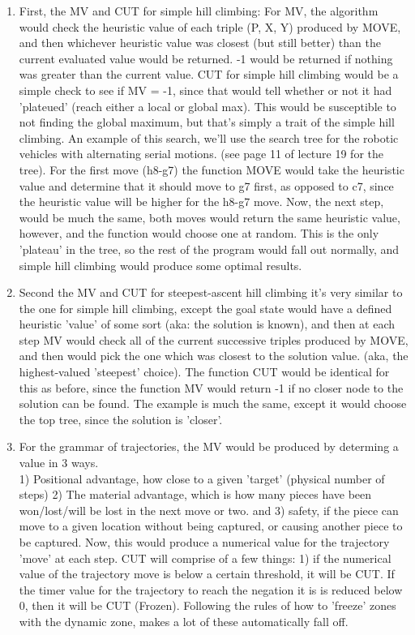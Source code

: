 \documentclass[11pt]{article}
\begin{document}
\begin{enumerate} 
\item First, the MV and CUT for simple hill climbing: 
For MV, the algorithm would check the heuristic value of each triple (P, X, Y) produced by MOVE, and then whichever heuristic value was closest (but still better) than the current evaluated value would be returned. -1 would be returned if nothing was greater than the current value. CUT for simple hill climbing would be a simple check to see if MV = -1, since that would tell whether or not it had 'plateued' (reach either a local or global max). This would be susceptible to not finding the global maximum, but that's simply a trait of the simple hill climbing. An example of this search, 
we'll use the search tree for the robotic vehicles with alternating serial motions. (see page 11 of lecture 19 for the tree). For the first move (h8-g7) the function MOVE would take the heuristic value and determine that it should move to g7 first, as opposed to c7, since the heuristic value will be higher for the h8-g7 move. Now, the next step, would be much the same, both moves would return the same heuristic value, however, and the function would choose one at random. This is the only 'plateau' in the tree, so the rest of the program would fall out normally, and simple hill climbing would produce some optimal results. 
\item Second the MV and CUT for steepest-ascent hill climbing it's very similar to the one for simple hill climbing, except the goal state would have a defined heuristic 'value' of some sort (aka: the solution is known), and then at each step MV would check all of the current successive triples produced by MOVE, and then would pick the one which was closest to the solution value. (aka, the highest-valued 'steepest' choice). The function CUT would be identical for this as before, since the function MV would return -1 if no closer node to the solution can be found. The example is much the same, except it would choose the top tree, since the solution is 'closer'. 
\item For the grammar of trajectories, the MV would be produced by determing a value in 3 ways.\\ 1) Positional advantage, how close to a given 'target' (physical number of steps) 2) The material advantage, which is how many pieces have been won/lost/will be lost in the next move or two. and 3) safety, if the piece can move to a given location without being captured, or causing another piece to be captured. Now, this would produce a numerical value for the trajectory 'move' at each step. CUT will comprise of a few things: 1) if the numerical value of the trajectory move is below a certain threshold, it will be CUT. If the timer value for the trajectory to reach the negation it is is reduced below 0, then it will be CUT (Frozen). Following the rules of how to 'freeze' zones with the dynamic zone, makes a lot of these automatically fall off. 

\end{enumerate}
\end{document}
